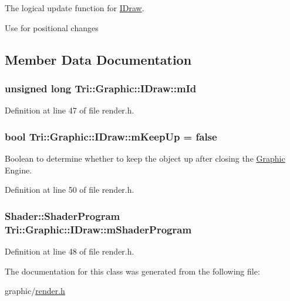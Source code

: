 The logical update function for \hyperlink{class_tri_1_1_graphic_1_1_i_draw}{I\+Draw}. 

Use for positional changes 

\subsection{Member Data Documentation}
\hypertarget{class_tri_1_1_graphic_1_1_i_draw_a8e15d0b6ba0dc7439d4a2cd13da1cda0}{}
\subsubsection[{m\+Id}]{\setlength{\rightskip}{0pt plus 5cm}unsigned long Tri\+::\+Graphic\+::\+I\+Draw\+::m\+Id\hspace{0.3cm}{\ttfamily [protected]}}\label{class_tri_1_1_graphic_1_1_i_draw_a8e15d0b6ba0dc7439d4a2cd13da1cda0}


Definition at line 47 of file render.\+h.

\hypertarget{class_tri_1_1_graphic_1_1_i_draw_af3a5753923c1b956b56194f8d12a3405}{}
\subsubsection[{m\+Keep\+Up}]{\setlength{\rightskip}{0pt plus 5cm}bool Tri\+::\+Graphic\+::\+I\+Draw\+::m\+Keep\+Up = false}\label{class_tri_1_1_graphic_1_1_i_draw_af3a5753923c1b956b56194f8d12a3405}


Boolean to determine whether to keep the object up after closing the \hyperlink{namespace_tri_1_1_graphic}{Graphic} Engine. 



Definition at line 50 of file render.\+h.

\hypertarget{class_tri_1_1_graphic_1_1_i_draw_a37fb2171ca69c8f803c0266814c7296b}{}
\subsubsection[{m\+Shader\+Program}]{\setlength{\rightskip}{0pt plus 5cm}Shader\+::\+Shader\+Program Tri\+::\+Graphic\+::\+I\+Draw\+::m\+Shader\+Program\hspace{0.3cm}{\ttfamily [protected]}}\label{class_tri_1_1_graphic_1_1_i_draw_a37fb2171ca69c8f803c0266814c7296b}


Definition at line 48 of file render.\+h.



The documentation for this class was generated from the following file\+:\begin{DoxyCompactItemize}
\item 
graphic/\hyperlink{render_8h}{render.\+h}\end{DoxyCompactItemize}
